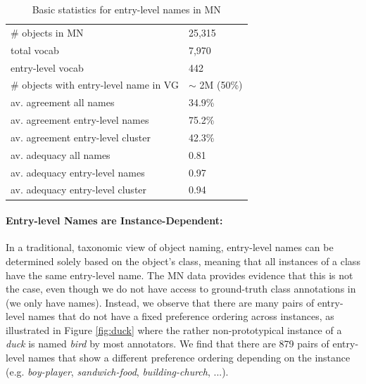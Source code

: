 \begin{table}[t]
	\centering
	\small
	\begin{tabular}{p{5cm}l}
		\toprule		
\# objects in MN & 25,315\\
total vocab  &  7,970\\
entry-level vocab & 442\\
\# objects with entry-level name in VG & $\sim$ 2M (50\%)\\
\midrule
av. agreement all names & 34.9\%\\
av. agreement entry-level names & 75.2\%\\
av. agreement entry-level cluster & 42.3\%\\
\midrule
av. adequacy all names & 0.81\\
av. adequacy entry-level names & 0.97 \\
av. adequacy entry-level cluster & 0.94 \\
\bottomrule	
	\end{tabular}
	\caption{Basic statistics for entry-level names in MN}
	\label{tab:stat-entry-level}
\end{table}

\paragraph{Entry-level Names are Instance-Dependent:} In a traditional, taxonomic view of object naming, entry-level names can be determined solely based on the object's class, meaning that all instances of a class have the same entry-level name. The MN data provides evidence that this is not the case, even though we do not have access to ground-truth class annotations in \vg (we only have names). Instead, we observe that there are many pairs of entry-level names that do not have a fixed preference ordering across instances, as illustrated in Figure \ref{fig:duck} where the rather non-prototypical instance of a \textit{duck} is named \textit{bird} by most annotators. We find that there are 879 pairs of entry-level names that show a different preference ordering depending on the instance (e.g. \textit{boy-player}, \textit{sandwich-food}, \textit{building-church}, ...).


  


